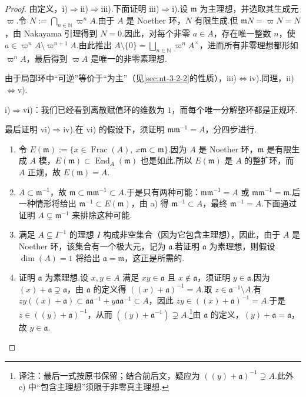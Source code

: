 \begin{proof}
由定义，i)$\Rightarrow$ii)$\Rightarrow$iii).下面证明 iii)$\Rightarrow$i).设 $\mathfrak m$ 为主理想，并选取其生成元 $\varpi$.令 $N:=\bigcap_{n\in\mathbb N}\varpi^nA$.由于 $A$ 是 Noether 环，$N$ 有限生成.但 $\mathfrak mN=\varpi N=N$，由 Nakayama 引理得到 $N=0$.因此，对每个非零 $a\in A$，存在唯一整数 $n$，使 $a\in\varpi^nA\setminus\varpi^{n+1}A$.由此推出 $A\setminus\{0\}=\bigsqcup_{n\in\mathbb N}\varpi^nA^\times$，进而所有非零理想都形如 $\varpi^nA$，最后得到 $\varpi A$ 是唯一的非零素理想.

由于局部环中``可逆''等价于``为主''（见\ref{sec:nt-3-2-2}的性质），iii)$\Longleftrightarrow$iv).同理，ii)$\Longleftrightarrow$v).

i)$\Rightarrow$vi)：我们已经看到离散赋值环的维数为 $1$，而每个唯一分解整环都是正规环.

最后证明 vi)$\Rightarrow$iv).在 vi) 的假设下，须证明 $\mathfrak m\mathfrak m^{-1}=A$，分四步进行.
\begin{enumerate}[label=\alph*)]
\item 令 $E(\mathfrak m):=\{x\in\operatorname{Frac}(A),\ x\mathfrak m\subset\mathfrak m\}$.因为 $A$ 是 Noether 环，$\mathfrak m$ 是有限生成 $A$ 模，$E(\mathfrak m)\subset\operatorname{End}_A(\mathfrak m)$ 也是如此.所以 $E(\mathfrak m)$ 是 $A$ 的整扩环，而 $A$ 正规，故 $E(\mathfrak m)=A$.
\item $A\subset\mathfrak m^{-1}$，故 $\mathfrak m\subset\mathfrak m\mathfrak m^{-1}\subset A$.于是只有两种可能：$\mathfrak m\mathfrak m^{-1}=A$ 或 $\mathfrak m\mathfrak m^{-1}=\mathfrak m$.后一种情形将给出 $\mathfrak m^{-1}\subset E(\mathfrak m)$，由 a) 得 $\mathfrak m^{-1}\subset A$，最终 $\mathfrak m^{-1}=A$.下面通过证明 $A\subsetneq\mathfrak m^{-1}$ 来排除这种可能.
\item 满足 $A\subsetneq I^{-1}$ 的理想 $I$ 构成非空集合（因为它包含主理想），因此，由于 $A$ 是 Noether 环，该集合有一个极大元，记为 $\mathfrak a$.若证明 $\mathfrak a$ 为素理想，则假设 $\dim(A)=1$ 将给出 $\mathfrak a=\mathfrak m$，这正是所需的.
\item 证明 $\mathfrak a$ 为素理想.设 $x,y\in A$ 满足 $xy\in\mathfrak a$ 且 $x\notin\mathfrak a$，须证明 $y\in\mathfrak a$.因为 $(x)+\mathfrak a\supsetneq\mathfrak a$，由 $\mathfrak a$ 的定义得 $((x)+\mathfrak a)^{-1}=A$.取 $z\in\mathfrak a^{-1}\setminus A$.有 $zy((x)+\mathfrak a)\subset\mathfrak a\mathfrak a^{-1}+y\mathfrak a\mathfrak a^{-1}\subset A$，因此 $zy\in((x)+\mathfrak a)^{-1}=A$.于是 $z\in((y)+\mathfrak a)^{-1}$，从而 $((y)+\mathfrak a^{-1})\supsetneq A$.\footnote{译注：最后一式按原书保留；结合前后文，疑应为 $((y)+\mathfrak a)^{-1}\supsetneq A$.此外 c) 中``包含主理想''须限于非零真主理想.}由 $\mathfrak a$ 的定义，$(y)+\mathfrak a=\mathfrak a$，故 $y\in\mathfrak a$.
\end{enumerate}
\end{proof}

